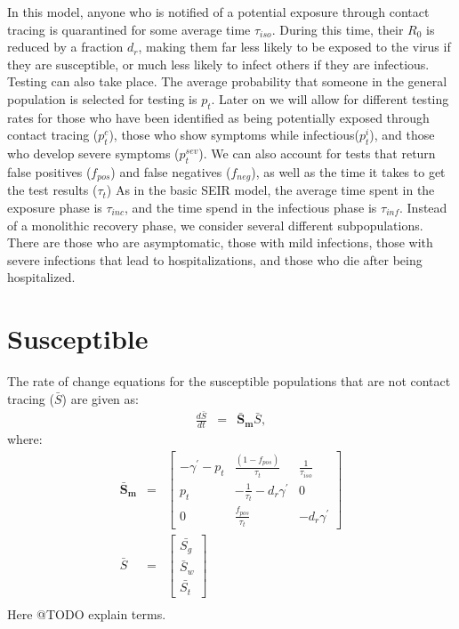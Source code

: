 \documentclass[notitlepage, superscriptaddress]{revtex4-2}
\begin{document}
In this model, anyone who is notified of a potential exposure through contact tracing is quarantined for some average time $\tau_{iso}$. During this time, their $R_{0}$ is reduced by a fraction $d_{r}$, making them far less likely to be exposed to the virus if they are susceptible, or much less likely to infect others if they are infectious. Testing can also take place. The average probability that someone in the general population is selected for testing is $p_{t}$. Later on we will allow for different testing rates for those who have been identified as being potentially exposed through contact tracing ($p^{c}_{t}$), those who show symptoms while infectious($p^{i}_{t}$), and those who develop severe symptoms ($p^{sev}_{t}$). We can also account for tests that return false positives ($f_{pos}$) and false negatives ($f_{neg}$), as well as the time it takes to get the test results ($\tau_{t}$) As in the basic SEIR model, the average time spent in the exposure phase is $\tau_{inc}$, and the time spend in the infectious phase is $\tau_{inf}$. Instead of a monolithic recovery phase, we consider several different subpopulations. There are those who are asymptomatic, those with mild infections, those with severe infections that lead to hospitalizations, and those who die after being hospitalized.

\section{Susceptible}
The rate of change equations for the susceptible populations that are not contact tracing ($\bar{S}$) are given as:
\begin{eqnarray}
\frac{d\bar{S}}{dt} &=& \boldsymbol{\bar{S}_{m}}  \bar{S}, 
\end{eqnarray}
where:
\begin{eqnarray}
\boldsymbol{\bar{S}_{m}} &=&
\begin{bmatrix}
-\gamma^{'} - p_{t}  &  \frac{(1-f_{pos})}{\tau_{t}}             & \frac{1}{\tau_{iso}} \\ 
 p_{t}              & -\frac{1}{\tau_{t}} - d_{r} \gamma^{'}    & 0  \\ 
 0                  & \frac{f_{pos}}{\tau_{t}}                  &  -d_{r} \gamma^{'}
\end{bmatrix} \\ 
%
\bar{S} &=& 
\begin{bmatrix}
\bar{S_{g}} \\ \bar{S}_{w}\\ \bar{S_{t}}
\end{bmatrix} \\
\end{eqnarray}
Here @TODO explain terms.
\end{document}
